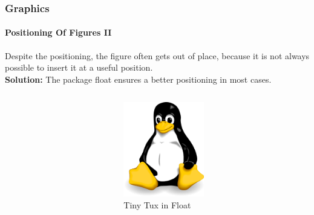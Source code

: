 
\begin{frame}[t]
\medskip
\frametitle{Graphics}
\framesubtitle{Positioning Of Figures II}
Despite the positioning, the figure often gets out of place, because it is not always possible to insert it at a useful position.\\
\textbf{Solution:} The package {\ttfamily float} ensures a better positioning in most cases.

\begin{columns}
\begin{column}{.5\textwidth}
{\ttfamily {\footnotesize
}}
\end{column}

\begin{column}{.5\textwidth} 
\begin{figure}
\begin{center}
    \includegraphics[width=35mm]{image/tux.png}
\caption{Tiny Tux in Float}
\label{img:kleinertux_float}
\end{center}
\end{figure}
\end{column}
\end{columns}

\end{frame}
